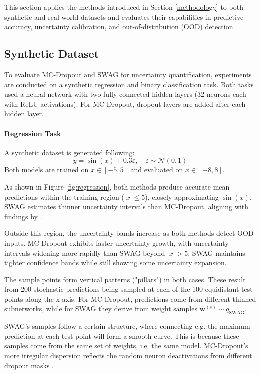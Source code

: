 
This section applies the methods introduced in Section \ref{methodology} to both synthetic and
real‑world datasets and evaluates their capabilities in predictive accuracy, uncertainty calibration, and out-of-distribution (OOD) detection.

\subsection{Synthetic Dataset}
\label{exp:synthetic}
To evaluate MC-Dropout and SWAG for uncertainty quantification, experiments are conducted on a synthetic 
regression and binary classification task. Both tasks used a neural network with two fully-connected
hidden layers (32 neurons each with ReLU activations). For MC‑Dropout, dropout layers are added
after each hidden layer.

\paragraph{Regression Task}
A synthetic dataset is generated following:
\[
y = \sin(x) + 0.3\varepsilon, \quad \varepsilon \sim \mathcal{N}(0,1)
\]
Both models are trained on $x \in [-5, 5]$ and evaluated on $x \in [-8, 8]$.

\vspace{0.15cm}
As shown in Figure \ref{fig:regression}, both methods produce accurate mean predictions within the training region ($|x| \leq 5$), closely approximating $\sin(x)$. SWAG estimates thinner
uncertainty intervals than MC-Dropout, aligning with findings by \citet{maddox2019swag}.

Outside this region, the uncertainty bands increase as both methods detect OOD inputs. MC-Dropout
exhibits faster uncertainty growth, with uncertainty intervals widening more rapidly than SWAG beyond
$|x| > 5$. SWAG maintains tighter confidence bands while still showing some uncertainty expansion.

The sample points form vertical patterns ("pillars") in both cases. These result from 200 stochastic
predictions being sampled at each of the 100 equidistant test points along the x-axis. For MC-Dropout,
predictions come from different thinned subnetworks, while for SWAG they derive from weight samples
$\mathbf{w}^{(s)} \sim q_{\mathrm{SWAG}}$.

SWAG's samples follow a certain structure, where connecting e.g. the maximum prediction at each test
point will form a smooth curve. This is because these samples come from the same set of weights,
i.e. the same model. MC-Dropout's more irregular dispersion reflects the random neuron deactivations
from different dropout masks \citep{gal2016mcdropout}.

